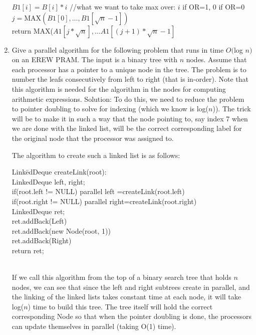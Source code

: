 \documentclass{article}
\begin{document}
\begin{enumerate}
\begin{tabbing}
\>\>$B1[i]=B[i]*i$ //what we want to take max over: $i$ if OR=1, 0 if OR=0\\
\>$j=$MAX$(B1[0],\ldots ,B1[\sqrt{n}-1])$\\
\>return MAX($A1[j*\sqrt{n}],\ldots A1[(j+1)*\sqrt{n}-1]$\\
\end{tabbing}
\setcounter{enumi}{20}
\item Give a parallel algorithm for the following problem that runs in time $O($log $n)$ on an EREW PRAM. The input is a binary tree with $n$ nodes. Assume that each processor has a pointer to a unique node in the tree. The problem is to number the leafs consecutively from left to right (that is in-order). Note that this algorithm is needed for the algorithm in the nodes for computing arithmetic expressions.
\newline
\newline Solution: To do this, we need to reduce the problem to pointer doubling to solve for indexing (which we know is log($n$)). The trick will be to make it in such a way that the node pointing to, say index 7 when we are done with the linked list, will be the correct corresponding label for the original node that the processor was assigned to.

The algorithm to create such a linked list is as follows:
\begin{tabbing}
Link\=edDeque createLink(root):\\
\>LinkedDeque left, right;\\
\>if(root.left != NULL) parallel left =createLink(root.left)\\
\>if(root.right != NULL) parallel right=createLink(root.right)\\
\>LinkedDeque ret;\\
\>ret.addBack(Left)\\
\>ret.addBack(new Node(root, 1))\\
\>ret.addBack(Right)\\
\>return ret;\\
\\
\end{tabbing}
If we call this algorithm from the top of a binary search tree that holds $n$ nodes, we can see that since the left and right subtrees create in parallel, and the linking of the linked lists takes constant time at each node, it will take log($n$) time to build this tree. The tree itself will hold the correct corresponding Node so that when the pointer doubling is done, the processors can update themselves in parallel (taking O(1) time).


\end{enumerate}
\end{document}
